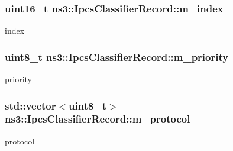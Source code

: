 \subsubsection[{\texorpdfstring{m\+\_\+index}{m_index}}]{\setlength{\rightskip}{0pt plus 5cm}uint16\+\_\+t ns3\+::\+Ipcs\+Classifier\+Record\+::m\+\_\+index\hspace{0.3cm}{\ttfamily [private]}}\hypertarget{classns3_1_1IpcsClassifierRecord_a62ea826b5a15e0db1dfeec2f85c870cf}{}\label{classns3_1_1IpcsClassifierRecord_a62ea826b5a15e0db1dfeec2f85c870cf}


index 

\subsubsection[{\texorpdfstring{m\+\_\+priority}{m_priority}}]{\setlength{\rightskip}{0pt plus 5cm}uint8\+\_\+t ns3\+::\+Ipcs\+Classifier\+Record\+::m\+\_\+priority\hspace{0.3cm}{\ttfamily [private]}}\hypertarget{classns3_1_1IpcsClassifierRecord_ac92730633e3a9b2143ddc48140780be8}{}\label{classns3_1_1IpcsClassifierRecord_ac92730633e3a9b2143ddc48140780be8}


priority 

\subsubsection[{\texorpdfstring{m\+\_\+protocol}{m_protocol}}]{\setlength{\rightskip}{0pt plus 5cm}std\+::vector$<$uint8\+\_\+t$>$ ns3\+::\+Ipcs\+Classifier\+Record\+::m\+\_\+protocol\hspace{0.3cm}{\ttfamily [private]}}\hypertarget{classns3_1_1IpcsClassifierRecord_adfc6f43d00633b034bc8940a7ae9126c}{}\label{classns3_1_1IpcsClassifierRecord_adfc6f43d00633b034bc8940a7ae9126c}


protocol 

